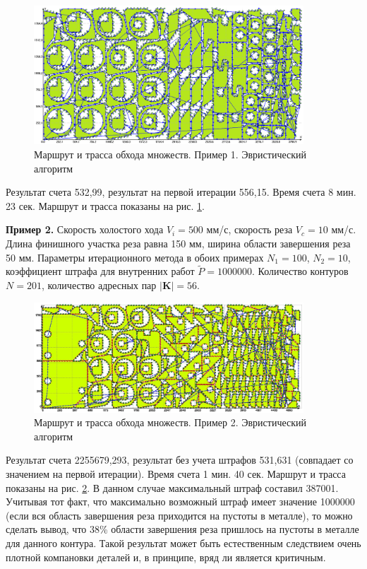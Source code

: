 \documentclass[11pt,twoside,openany]{report}
\begin{document}
{{\begin{figure}
  \begin{center}
  \includegraphics[width=0.9\textwidth]{route_170_approximate_CA.png}
  \caption{Маршрут и трасса обхода множеств. Пример 1. Эвристический алгоритм}
  \label{Sample1Heuristic}
  \end{center}
\end{figure}

Результат счета 532,99, результат на первой итерации 556,15.
Время счета 8 мин. 23 сек.
Маршрут и трасса показаны на рис. \ref{Sample1Heuristic}.

{\bf Пример 2.} Скорость холостого хода $V_i=500$ мм/с, скорость реза $V_c=10$ мм/с.
Длина финишного участка реза равна 150 мм, ширина области завершения реза 50 мм.
Параметры итерационного метода в обоих примерах $N_1=100$, $N_2=10$,
коэффициент штрафа для внутренних работ $\tilde{P}=1000000$.
Количество контуров $N=201$, количество адресных пар $|\mathbf{K}|=56$.

\begin{figure}
  \begin{center}
  \includegraphics[width=0.9\textwidth]{Sample_201_sets_approximate.png}
  \caption{Маршрут и трасса обхода множеств. Пример 2. Эвристический алгоритм}
  \label{Sample2Heuristic}
  \end{center}
\end{figure}

Результат счета 2255679,293, результат без учета штрафов 531,631 (совпадает
со значением на первой итерации). Время счета 1 мин. 40 сек.
Маршрут и трасса показаны на рис. \ref{Sample2Heuristic}.
В данном случае максимальный штраф составил 387001. Учитывая тот факт, что
максимально возможный штраф имеет значение 1000000 (если вся область завершения
реза приходится на пустоты в металле), то можно сделать вывод, что 38\% области
завершения реза пришлось на пустоты в металле для данного контура. Такой
результат может быть естественным следствием очень плотной компановки деталей
и, в принципе, вряд ли является критичным.

}}
\end{document}
